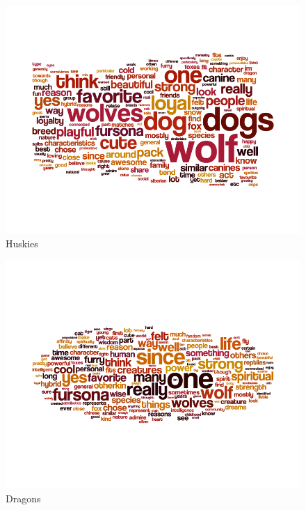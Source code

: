\begin{figure}
  \begin{center}
    \includegraphics[width=\textwidth]{content/assets/species-2--husky}
  \end{center}
  \caption{Huskies}
\end{figure}

\begin{figure}
  \begin{center}
    \includegraphics[width=\textwidth]{content/assets/species-2--dragon}
  \end{center}
  \caption{Dragons}
\end{figure}

